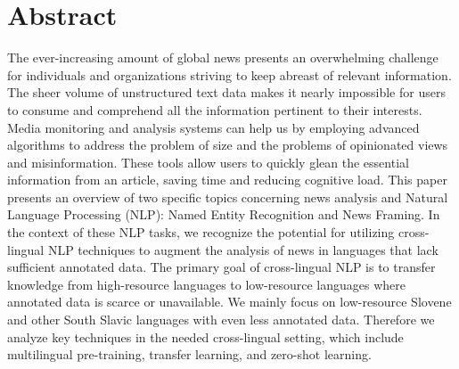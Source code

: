 % 
\chapter*{Abstract}

The ever-increasing amount of global news presents an overwhelming challenge for individuals and organizations striving to keep abreast of relevant information. 
The sheer volume of unstructured text data makes it nearly impossible for users to consume and comprehend all the information pertinent to their interests.
Media monitoring and analysis systems can help us by employing advanced algorithms to address the problem of size and the problems of opinionated views and misinformation.
These tools allow users to quickly glean the essential information from an article, saving time and reducing cognitive load.
This paper presents an overview of two specific topics concerning news analysis and Natural Language Processing (NLP): Named Entity Recognition and News Framing.
In the context of these NLP tasks, we recognize the potential for utilizing cross-lingual NLP techniques to augment the analysis of news in languages that lack sufficient annotated data.
The primary goal of cross-lingual NLP is to transfer knowledge from high-resource languages to low-resource languages where annotated data is scarce or unavailable.
We mainly focus on low-resource Slovene and other South Slavic languages with even less annotated data.
Therefore we analyze key techniques in the needed cross-lingual setting, which include multilingual pre-training, transfer learning, and zero-shot learning.

